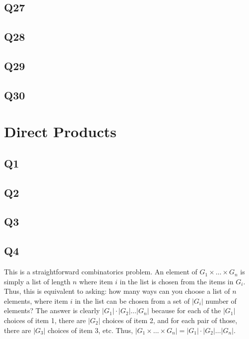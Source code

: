 \documentclass[12pt]{article}
\numberwithin{theorem}{section}
\numberwithin{equation}{section}
\numberwithin{remark}{section}
\numberwithin{definition}{section}
\numberwithin{theorem}{section}
\numberwithin{lemma}{section}
\numberwithin{example}{section}
\begin{document}
\subsection{Q27}

\subsection{Q28}

\subsection{Q29}

\subsection{Q30}

\newpage

\section{Direct Products}

\subsection{Q1}

\subsection{Q2}

\subsection{Q3}

\subsection{Q4}

This is a straightforward combinatorics problem. An element of $G_1\times\ldots \times G_n$ is simply a list of length $n$ where item $i$ in the list is chosen from the items in $G_i$. Thus, this is equivalent to asking: how many ways can you choose a list of $n$ elements, where item $i$ in the list can be chosen from a set of $|G_i|$ number of elements? The answer is clearly $|G_1|\cdot |G_2| \ldots |G_n|$ because for each of the $|G_1|$ choices of item 1, there are $|G_2|$ choices of item 2, and for each pair of those, there are $|G_3|$ choices of item 3, etc. Thus, $|G_1\times\ldots \times G_n|=|G_1|\cdot |G_2| \ldots |G_n|$.
\end{document}
